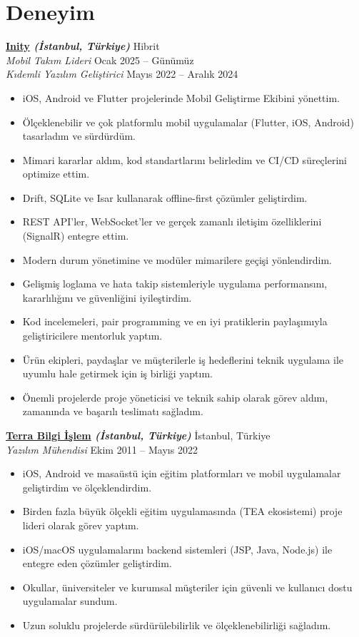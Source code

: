 \documentclass[10pt,a4paper]{extarticle}
\begin{document}
\section{Deneyim}
\vspace{5pt}
\textbf{\href{https://inity.com.tr}{Inity} \textit{(İstanbul, Türkiye)}} \hfill Hibrit\\
\textit{Mobil Takım Lideri} \hfill Ocak 2025 -- Günümüz\\
\textit{Kıdemli Yazılım Geliştirici} \hfill Mayıs 2022 -- Aralık 2024
\vspace{5pt}
\begin{itemize}[leftmargin=*,noitemsep,topsep=0pt]
    \item iOS, Android ve Flutter projelerinde Mobil Geliştirme Ekibini yönettim.
	\item Ölçeklenebilir ve çok platformlu mobil uygulamalar (Flutter, iOS, Android) tasarladım ve sürdürdüm.
	\item Mimari kararlar aldım, kod standartlarını belirledim ve CI/CD süreçlerini optimize ettim.
	\item Drift, SQLite ve Isar kullanarak offline-first çözümler geliştirdim.
	\item REST API’ler, WebSocket’ler ve gerçek zamanlı iletişim özelliklerini (SignalR) entegre ettim.
	\item Modern durum yönetimine ve modüler mimarilere geçişi yönlendirdim.
	\item Gelişmiş loglama ve hata takip sistemleriyle uygulama performansını, kararlılığını ve güvenliğini iyileştirdim.
	\item Kod incelemeleri, pair programming ve en iyi pratiklerin paylaşımıyla geliştiricilere mentorluk yaptım.
	\item Ürün ekipleri, paydaşlar ve müşterilerle iş hedeflerini teknik uygulama ile uyumlu hale getirmek için iş birliği yaptım.
    \item Önemli projelerde proje yöneticisi ve teknik sahip olarak görev aldım, zamanında ve başarılı teslimatı sağladım.
\end{itemize}
\vspace{15pt}
\textbf{\href{https://www.terrabilgiisilem}{Terra Bilgi İşlem} \textit{(İstanbul, Türkiye)}} \hfill İstanbul, Türkiye\\
\textit{Yazılım Mühendisi} \hfill Ekim 2011 -- Mayıs 2022
\vspace{5pt}
\begin{itemize}[leftmargin=*,noitemsep,topsep=0pt]
    \item iOS, Android ve masaüstü için eğitim platformları ve mobil uygulamalar geliştirdim ve ölçeklendirdim.
	\item Birden fazla büyük ölçekli eğitim uygulamasında (TEA ekosistemi) proje lideri olarak görev yaptım.
	\item iOS/macOS uygulamalarını backend sistemleri (JSP, Java, Node.js) ile entegre eden çözümler geliştirdim.
	\item Okullar, üniversiteler ve kurumsal müşteriler için güvenli ve kullanıcı dostu uygulamalar sundum.
	\item Uzun soluklu projelerde sürdürülebilirlik ve ölçeklenebilirliği sağladım.
\end{itemize}
\end{document}
